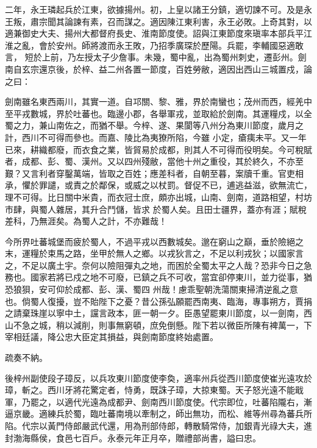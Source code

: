 \begin{pinyinscope}
 二年，永王璘起兵於江東，欲據揚州。初，上皇以諸王分鎮，適切諫不可。及是永王叛，肅宗聞其論諫有素，召而謀之。適因陳江東利害，永王必敗。上奇其對，以適兼御史大夫、揚州大都督府長史、淮南節度使。詔與江東節度來瑱率本部兵平江淮之亂，會於安州。師將渡而永王敗，乃招季廣琛於歷陽。兵罷，李輔國惡適敢言，
 短於上前，乃左授太子少詹事。未幾，蜀中亂，出為蜀州刺史，遷彭州。劍南自玄宗還京後，於梓、益二州各置一節度，百姓勞敝，適因出西山三城置戍，論之曰：



 劍南雖名東西兩川，其實一道。自邛關、黎、雅，界於南蠻也；茂州而西，經羌中至平戎數城，界於吐蕃也。臨邊小郡，各舉軍戎，並取給於劍南。其運糧戍，以全蜀之力，兼山南佐之，而猶不舉。今梓、遂、果閬等八州分為東川節度，歲月之計，西川不可得而參也。而嘉、陵比為夷獠所陷，今雖
 小定，瘡痍未平。又一年已來，耕織都廢，而衣食之業，皆貿易於成都，則其人不可得而役明矣。今可稅賦者，成都、彭、蜀、漢州。又以四州殘敝，當他十州之重役，其於終久，不亦至艱？又言利者穿鑿萬端，皆取之百姓；應差科者，自朝至暮，案牘千重。官吏相承，懼於罪譴，或責之於鄰保，或威之以杖罰。督促不已，逋逃益滋，欲無流亡，理不可得。比日關中米貴，而衣冠士庶，頗亦出城，山南、劍南，道路相望，村坊市肆，與蜀人雜居，其升合鬥儲，皆求
 於蜀人矣。且田士疆界，蓋亦有涯；賦稅差科，乃無涯矣。為蜀人之計，不亦難哉！



 今所界吐蕃城堡而疲於蜀人，不過平戎以西數城矣。邈在窮山之巔，垂於險絕之末，運糧於束馬之路，坐甲於無人之鄉。以戎狄言之，不足以利戎狄；以國家言之，不足以廣土宇。奈何以險阻彈丸之地，而困於全蜀太平之人哉？恐非今日之急務也。國家若將已戍之地不可廢，已鎮之兵不可收，當宜卻停東川，並力從事，猶恐狼狽，安可仰於成都、彭、漢、蜀四
 州哉！慮乖聖朝洗蕩關東掃清逆亂之意也。倘蜀人復擾，豈不貽陛下之憂？昔公孫弘願罷西南夷、臨海，專事朔方，賈捐之請棄珠崖以寧中土，讜言政本，匪一朝一夕。臣愚望罷東川節度，以一劍南，西山不急之城，稍以減削，則事無窮頓，庶免倒懸。陛下若以微臣所陳有裨萬一，下宰相廷議，降公忠大臣定其損益，與劍南節度終始處置。



 疏奏不納。



 後梓州副使段子璋反，以兵攻東川節度使李奐，適率州兵從西川節度使崔光遠攻於
 璋，斬之。西川牙將花驚定者，恃勇，既誅子璋，大掠東蜀。天子怒光遠不能戢軍，乃罷之，以適代光遠為成都尹、劍南西川節度使。代宗即位，吐蕃陷隴右，漸逼京畿。適練兵於蜀，臨吐蕃南境以牽制之，師出無功，而松、維等州尋為蕃兵所陷。代宗以黃門侍郎嚴武代還，用為刑部侍郎，轉散騎常侍，加銀青光祿大夫，進封渤海縣侯，食邑七百戶。永泰元年正月卒，贈禮部尚書，謚曰忠。




\end{pinyinscope}
